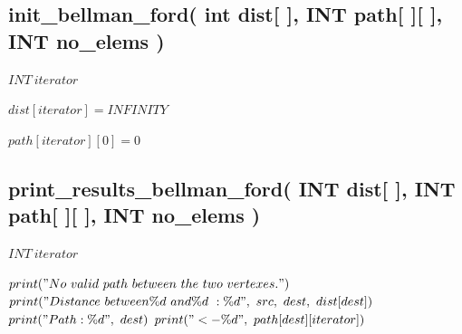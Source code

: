 \documentclass[12]{article}
\begin{document}
\subsection{init\_bellman\_ford( int dist[ ], INT path[ ][ ], INT no\_elems )}
\begin{algorithmic}[1]
\STATE $INT\ iterator$

        \STATE $dist[iterator] = INFINITY$
    \ENDFOR

        \STATE $path[iterator][0] = 0$
    \ENDFOR
\end{algorithmic}

\subsection{print\_results\_bellman\_ford( INT dist[ ], INT path[ ][ ], INT no\_elems )}
\begin{algorithmic}[1]
    \STATE $INT\ iterator$

        \STATE $print("No\ valid\ path\ between\ the\ two\ vertexes.")$
     \ELSE 
        \STATE $print("Distance\ between \%d\ and \%d\ : \%d",\ src,\ dest,\ dist[dest])$
        \STATE $print("Path: \%d ",\ dest)$
            \STATE $print("<- \%d ",\ path[dest][iterator])$
            \ENDFOR
        
    \ENDIF
\end{algorithmic}
\end{document}
